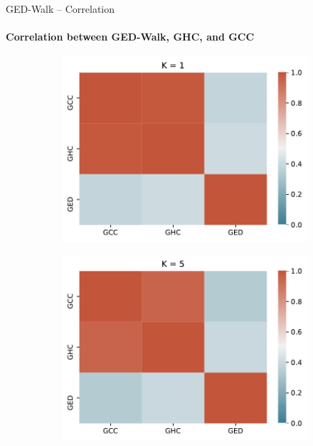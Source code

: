\documentclass[10pt,titlepage,english,presentation]{beamer}
\begin{document}
\begin{frame}[t]{GED-Walk -- Correlation}
\framesubtitle{Correlation between GED-Walk, GHC, and GCC}

\begin{figure}
\begin{subfigure}[t]{.33\textwidth}
\centering
\includegraphics[width=.9\textwidth]{./images/ged-corrs-k1.pdf}
\end{subfigure}\hfill
\begin{subfigure}[t]{.33\textwidth}
\centering
\includegraphics[width=.9\textwidth]{./images/ged-corrs-k5.pdf}
\end{subfigure}\hfill
\begin{subfigure}[t]{.33\textwidth}
\centering

\end{subfigure}
\end{figure}
\end{frame}
\end{document}
